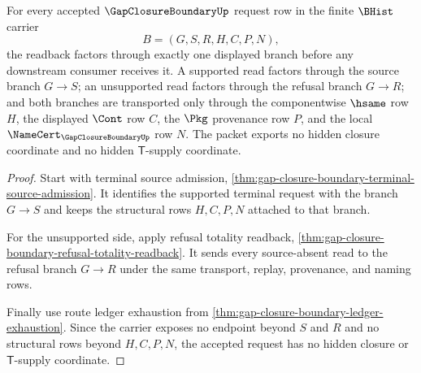 \begin{theorem}
\label{thm:gap-closure-boundary-source-refusal-totality}
For every accepted $\GapClosureBoundaryUp$ request row in the finite $\BHist$ carrier
$$
B=(G,S,R,H,C,P,N),
$$
the readback factors through exactly one displayed branch before any downstream consumer receives it. A supported read factors through the source branch $G \longrightarrow S$; an unsupported read factors through the refusal branch $G \longrightarrow R$; and both branches are transported only through the componentwise $\hsame$ row $H$, the displayed $\Cont$ row $C$, the $\Pkg$ provenance row $P$, and the local $\NameCert_{\GapClosureBoundaryUp}$ row $N$. The packet exports no hidden closure coordinate and no hidden $\mathsf{T}$-supply coordinate.
\end{theorem}
\begin{proof}
Start with terminal source admission, \autoref{thm:gap-closure-boundary-terminal-source-admission}. It identifies the supported terminal request with the branch $G \longrightarrow S$ and keeps the structural rows $H,C,P,N$ attached to that branch.

For the unsupported side, apply refusal totality readback, \autoref{thm:gap-closure-boundary-refusal-totality-readback}. It sends every source-absent read to the refusal branch $G \longrightarrow R$ under the same transport, replay, provenance, and naming rows.

Finally use route ledger exhaustion from \autoref{thm:gap-closure-boundary-ledger-exhaustion}. Since the carrier exposes no endpoint beyond $S$ and $R$ and no structural rows beyond $H,C,P,N$, the accepted request has no hidden closure or $\mathsf{T}$-supply coordinate.
\end{proof}

